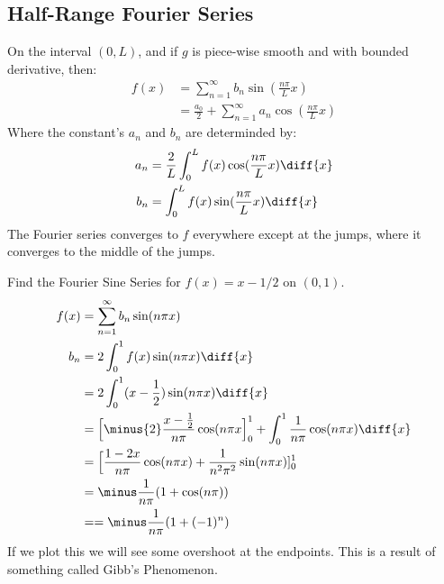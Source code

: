         \subsection{Half-Range Fourier Series}
            On the interval $(0, L)$, and if $g$ is piece-wise smooth
            and with bounded derivative, then:
            \begin{align}
                f(x)&=\sum_{n=1}^{\infty}b_{n}\sin(\frac{n\pi}{L}x)\\
                &=\frac{a_{0}}{2}+\sum_{n=1}^{\infty}
                    a_{n}\cos(\frac{n\pi}{L}x)
            \end{align}
            Where the constant's $a_{n}$ and $b_{n}$ are determinded by:
            \begin{align}
                a_{n}&=\frac{2}{L}
                    \int_{0}^{L}f(x)\cos(\frac{n\pi}{L}x)\diff{x}\\
                b_{n}&=
                    \int_{0}^{L}f(x)\sin(\frac{n\pi}{L}x)\diff{x}
            \end{align}
            The Fourier series converges to $f$ everywhere except at the
            jumps, where it converges to the middle of the jumps.
            \begin{lexample}
                Find the Fourier Sine Series for $f(x)=x-1/2$ on $(0,1)$.
                \begin{align}
                    f(x)&=\sum_{n=1}^{\infty}b_{n}\sin(n\pi{x})\\
                    b_{n}&=2\int_{0}^{1}f(x)\sin(n\pi{x})\diff{x}\\
                    &=2\int_{0}^{1}(x-\frac{1}{2})\sin(n\pi{x})\diff{x}\\
                    &=\Big[
                        \minus{2}\frac{x-\frac{1}{2}}{n\pi}\cos(n\pi{x}
                    \Big]_{0}^{1}+
                    \int_{0}^{1}\frac{1}{n\pi}\cos(n\pi{x})\diff{x}\\
                    &=\Big[
                        \frac{1-2x}{n\pi}\cos(n\pi{x})+
                        \frac{1}{n^{2}\pi^{2}}\sin(n\pi{x})
                    ]_{0}^{1}\\
                    &=\minus\frac{1}{n\pi}(1+\cos(n\pi))\\
                    &==\minus\frac{1}{n\pi}(1+(-1)^{n})
                \end{align}
                If we plot this we will see some overshoot at the endpoints.
                This is a result of something called Gibb's Phenomenon.
            \end{lexample}
